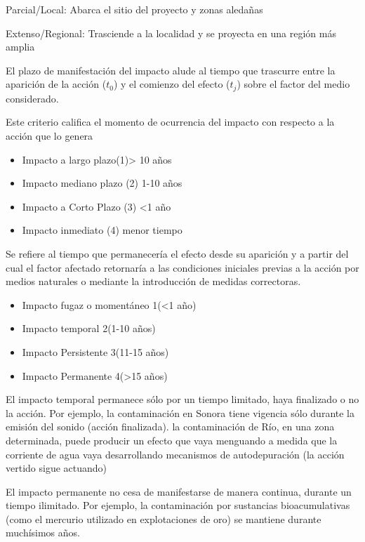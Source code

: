 Parcial/Local: Abarca el sitio del proyecto y zonas aledañas

Extenso/Regional: Trasciende a la localidad y se proyecta en una región más amplia
\begin{definition}[Momento (MO)]
El plazo de manifestación del impacto alude al tiempo que trascurre entre la aparición de
la acción ($t_0$) y el comienzo del efecto ($t_j$) sobre el factor del medio considerado.
\end{definition}
Este criterio califica el momento de ocurrencia del impacto con respecto a la acción que lo genera
\begin{itemize}
    \item Impacto a largo plazo(1)> 10 años
    \item Impacto mediano plazo (2) 1-10 años
    \item Impacto a Corto Plazo (3) <1 año
    \item Impacto inmediato (4) menor tiempo
\end{itemize}
\begin{definition}[Persistencia (PE)]
    Se refiere al tiempo que permanecería el efecto desde su aparición y a partir del cual el factor afectado retornaría a las condiciones iniciales previas a la acción por medios naturales o mediante la introducción de medidas correctoras.
\end{definition}
\begin{itemize}
    \item Impacto fugaz o momentáneo 1(<1 año)
    \item Impacto temporal 2(1-10 años)
    \item Impacto Persistente 3(11-15 años)
    \item Impacto Permanente 4(>15 años)
\end{itemize}

El impacto temporal permanece sólo por un tiempo limitado, haya finalizado o no  la acción. Por ejemplo, la contaminación en Sonora tiene vigencia sólo durante la emisión del sonido (acción finalizada). la contaminación de Río, en una zona determinada, puede producir un efecto que vaya menguando a medida que la corriente de agua vaya desarrollando mecanismos de autodepuración (la acción vertido sigue actuando)

El impacto permanente no cesa de manifestarse de manera continua, durante un tiempo ilimitado. Por ejemplo, la contaminación por sustancias bioacumulativas (como el mercurio utilizado en explotaciones de oro) se mantiene durante muchísimos años.

